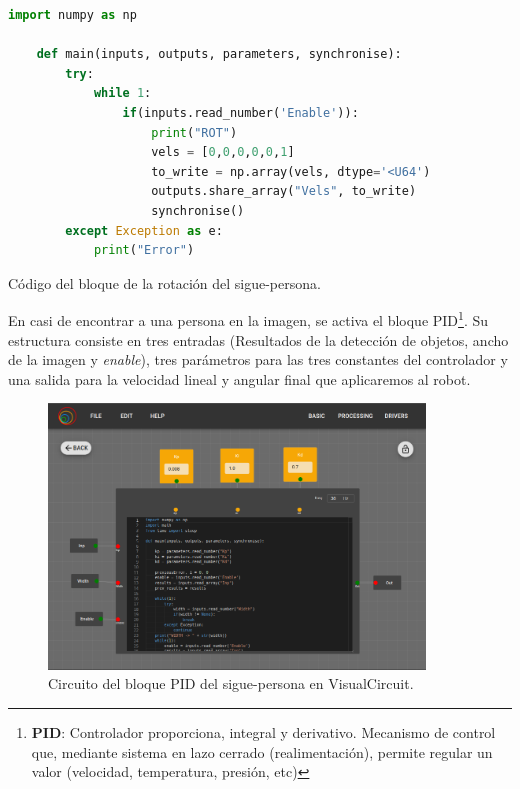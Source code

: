 \begin{code}[H]
    \begin{lstlisting}[language=python]
    import numpy as np

    def main(inputs, outputs, parameters, synchronise):
        try:
            while 1:
                if(inputs.read_number('Enable')):
                    print("ROT")
                    vels = [0,0,0,0,0,1]
                    to_write = np.array(vels, dtype='<U64')
                    outputs.share_array("Vels", to_write)   
                    synchronise()
        except Exception as e:
            print("Error")
    \end{lstlisting}
    \caption[Código bloque rotación sigue-persona]{Código del bloque de la rotación del sigue-persona.}
    \label{cod:rotation_follow_person}
\end{code}

En casi de encontrar a una persona en la imagen, se activa el bloque PID\footnote{
    \textbf{PID}: Controlador proporciona, integral y derivativo.
        Mecanismo de control que, mediante sistema en lazo cerrado (realimentación), permite regular
        un valor (velocidad, temperatura, presión, etc)}.
Su estructura consiste en tres entradas (Resultados de la detección de objetos, ancho de la imagen y \textit{enable}), tres parámetros para las
tres constantes del controlador y una salida para la velocidad lineal y angular final que aplicaremos al robot.

\begin{figure} [H]
    \begin{center}
        \includegraphics[width=10cm]{figs/c5/PID_follow_person.png}
    \end{center}
    \caption[Circuito del bloque PID sigue-persona]{Circuito del bloque PID del sigue-persona en VisualCircuit.}
    \label{fig:PID_follow_person}
\end{figure}

